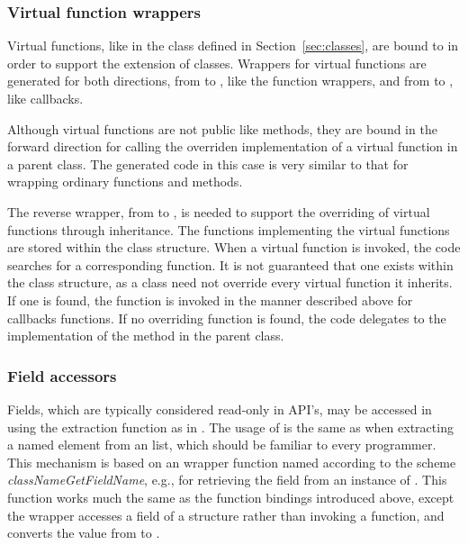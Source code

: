 \documentclass[article,shortnames]{jss}
\begin{document}


\subsubsection{Virtual function wrappers}
Virtual functions, like  in the
 class defined in Section~\ref{sec:classes}, are bound to  in order to support
the extension of  classes. Wrappers for virtual functions
are generated for both directions, from  to ,
like the function wrappers, and from  to ,
like callbacks. 

Although virtual functions are not public like methods, they are bound
in the forward direction for calling the overriden implementation of a
virtual function in a parent class.  The generated code in this case
is very similar to that for wrapping ordinary functions and methods.

The reverse wrapper, from  to , is needed to
support the overriding of virtual functions through inheritance. The
 functions implementing the virtual functions are stored
within the  class structure. When a virtual function is
invoked, the code searches for a corresponding  function.
It is not guaranteed that one exists within the class structure, as a
class need not override every virtual function it inherits. If one is
found, the  function is invoked in the manner described
above for callbacks functions. If no overriding function is found, the
code delegates to the implementation of the method in the parent
class.

\subsubsection{Field accessors}

Fields, which are typically considered read-only in
 API's, may be accessed in  using the
extraction function \code{[[} as in . The usage of
\code{[[} is the same as when extracting a named element from an
 list, which should be familiar to every
 programmer. 
This mechanism is based on an 
wrapper function named according to the scheme
\emph{classNameGetFieldName}, e.g.,  for
retrieving the  field from an instance of
. %
This function works much the same as the function bindings introduced
above, except the  wrapper accesses a field of a
 structure rather than invoking a function, and converts
the value from  to .
\end{document}
